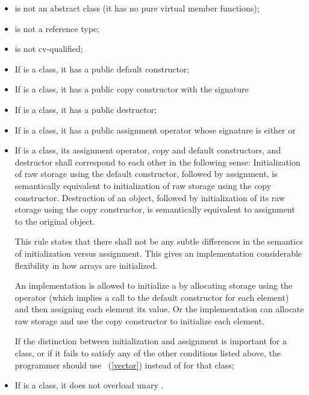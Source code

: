 \begin{itemize}
\item {} is not an abstract class (it has no pure virtual member functions);
\item {} is not a reference type;
\item {} is not cv-qualified;
\item If  is a class, it has a public default constructor;
\item If  is a class, it has a public copy constructor with the signature 
\item If  is a class, it has a public destructor;
\item If  is a class, it has a public assignment operator whose signature is either
or
\item If  is a class, its assignment operator, copy and default constructors,
and destructor shall correspond to each other in the following sense:
Initialization of raw storage using the default constructor, followed by
assignment, is semantically equivalent to initialization of raw
storage using the copy constructor.
Destruction of an object, followed by
initialization of its raw storage using the copy constructor,
is semantically equivalent to assignment to the original object.

\begin{note}
This rule states that there shall not be any subtle differences in the semantics
of initialization versus assignment.
This gives an implementation
considerable flexibility in how arrays are initialized.

\begin{example}
An implementation is allowed to initialize a
by allocating storage using the
operator (which
implies a call to the default constructor for each element) and then
assigning each element its value.
Or the implementation can allocate raw
storage and use the copy constructor to initialize each element.
\end{example}

If the distinction between initialization and assignment is important
for a class, or if it fails to satisfy any of
the other conditions listed above, the programmer should use
~(\ref{vector}) instead of
for that class;
\end{note}
\item If  is a class, it does not overload unary
.
\end{itemize}

